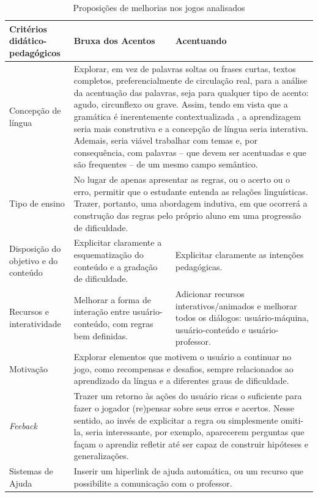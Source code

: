 \documentclass{textolivre}
\begin{document}
\begin{table}[h!]
\caption{Proposições de melhorias nos jogos analisados}
\centering
\label{tab1}
\begin{tabular}{p{}p{}p{}}
\toprule
Critérios didático-pedagógicos & Bruxa dos Acentos & Acentuando
\\
\midrule
Concepção de língua & \multicolumn{2}{p{0.6\textwidth+2\tabcolsep}}{Explorar, em vez de palavras soltas ou frases curtas, textos completos, preferencialmente de circulação real, para a análise da acentuação das palavras, seja para qualquer tipo de acento: agudo, circunflexo ou grave. Assim, tendo em vista que a gramática é inerentemente contextualizada \cite{antunes2014}, a aprendizagem seria mais construtiva e a concepção de língua seria interativa. Ademais, seria viável trabalhar com temas e, por consequência, com palavras – que devem ser acentuadas e que são frequentes – de um mesmo campo semântico.}
\\
\midrule
Tipo de ensino & \multicolumn{2}{p{0.6\textwidth+2\tabcolsep}}{No lugar de apenas apresentar as regras, ou o acerto ou o erro, permitir que o estudante entenda as relações linguísticas. Trazer, portanto, uma abordagem indutiva, em que ocorrerá a construção das regras pelo próprio aluno \cite{ludescher2006} em uma progressão de dificuldade.}
\\
\midrule
Disposição do objetivo e do conteúdo & Explicitar claramente a esquematização do conteúdo e a gradação de dificuldade. & Explicitar claramente as intenções pedagógicas.
\\
\midrule
Recursos e interatividade & Melhorar a forma de interação entre usuário-conteúdo, com regras bem definidas. & Adicionar recursos interativos/animados e melhorar todos os diálogos: usuário-máquina, usuário-conteúdo e usuário-professor. 
\\
\midrule
Motivação & \multicolumn{2}{p{0.6\textwidth+2\tabcolsep}}{Explorar elementos que motivem o usuário a continuar no jogo, como recompensas e desafios, sempre relacionados ao aprendizado da língua e a diferentes graus de dificuldade.}
\\
\midrule
\emph{Feeback} & \multicolumn{2}{p{0.6\textwidth+2\tabcolsep}}{Trazer um retorno às ações do usuário ricas o suficiente para fazer o jogador (re)pensar sobre seus erros e acertos. Nesse sentido, ao invés de explicitar a regra ou simplesmente omiti-la, seria interessante, por exemplo, aparecerem perguntas que façam o aprendiz refletir até ser capaz de construir hipóteses e generalizações.}
\\
\midrule
Sistemas de Ajuda & \multicolumn{2}{p{0.6\textwidth+2\tabcolsep}}{Inserir um hiperlink de ajuda automática, ou um recurso que possibilite a comunicação com o professor.}
\\
\bottomrule
\end{tabular}
\end{table}
\end{document}

